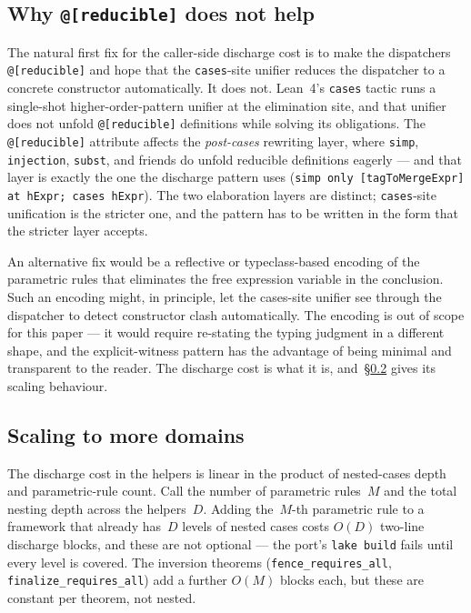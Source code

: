 \documentclass[acmsmall,screen,review,anonymous,nonacm]{acmart}
\begin{document}
\subsection{Why \texttt{@[reducible]} does not help}\label{sec:reducible-does-not-help}

The natural first fix for the caller-side discharge cost is to make the dispatchers \texttt{@[reducible]} and hope that the \texttt{cases}-site unifier reduces the dispatcher to a concrete constructor automatically. It does not. Lean~4's \texttt{cases} tactic runs a single-shot higher-order-pattern unifier at the elimination site, and that unifier does not unfold \texttt{@[reducible]} definitions while solving its obligations. The \texttt{@[reducible]} attribute affects the \emph{post-cases} rewriting layer, where \texttt{simp}, \texttt{injection}, \texttt{subst}, and friends do unfold reducible definitions eagerly --- and that layer is exactly the one the discharge pattern uses (\texttt{simp only [tagToMergeExpr] at hExpr; cases hExpr}). The two elaboration layers are distinct; \texttt{cases}-site unification is the stricter one, and the pattern has to be written in the form that the stricter layer accepts.

An alternative fix would be a reflective or typeclass-based encoding of the parametric rules that eliminates the free expression variable in the conclusion. Such an encoding might, in principle, let the cases-site unifier see through the dispatcher to detect constructor clash automatically. The encoding is out of scope for this paper --- it would require re-stating the typing judgment in a different shape, and the explicit-witness pattern has the advantage of being minimal and transparent to the reader. The discharge cost is what it is, and~\S\ref{sec:scaling} gives its scaling behaviour.

\subsection{Scaling to more domains}\label{sec:scaling}

The discharge cost in the helpers is linear in the product of nested-cases depth and parametric-rule count. Call the number of parametric rules~$M$ and the total nesting depth across the helpers~$D$. Adding the~$M$-th parametric rule to a framework that already has~$D$ levels of nested cases costs $O(D)$ two-line discharge blocks, and these are not optional --- the port's \texttt{lake build} fails until every level is covered. The inversion theorems (\texttt{fence\_requires\_all}, \texttt{finalize\_requires\_all}) add a further $O(M)$ blocks each, but these are constant per theorem, not nested.
\end{document}
